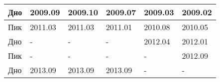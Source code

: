 \documentclass[a4paper,14pt]{extreport}
\begin{document}
\begin{table}[]
\begin{tabular}{|l|l|l|l|l|l|}
				Дно                                                                                                   & 2009.09                                                                                                                                                    & 2009.10                                                                    & 2009.07                                                                          & 2009.03                                                                   & 2009.02                                                                          \\ \hline
				Пик                                                                                                   & 2011.03                                                                                                                                                    & 2011.03                                                                    & 2011.01                                                                          & 2010.08                                                                   & 2010.05                                                                          \\
				Дно                                                                                                   & -                                                                                                                                                          & -                                                                          & -                                                                                & 2012.04                                                                   & 2012.01                                                                          \\ \hline
				Пик                                                                                                   & -                                                                                                                                                          & -                                                                          & -                                                                                & -                                                                         & 2012.09                                                                          \\
				Дно                                                                                                   & 2013.09                                                                                                                                                    & 2013.09                                                                    & 2013.09                                                                          & -                                                                         & -                                                                                \\ \hline

\end{tabular}
\end{table}
\end{document}
